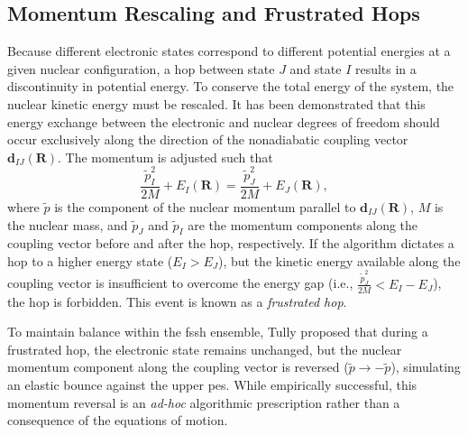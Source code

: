 \subsection{Momentum Rescaling and Frustrated Hops}
Because different electronic states correspond to different potential energies at a given nuclear configuration, a hop between state $J$ and state $I$ results in a discontinuity in potential energy. To conserve the total energy of the system, the nuclear kinetic energy must be rescaled. It has been demonstrated that this energy exchange between the electronic and nuclear degrees of freedom should occur exclusively along the direction of the nonadiabatic coupling vector $\symbf{d}_{IJ}(\symbf{R})$. The momentum is adjusted such that
\begin{equation}\label{eq:fssh_energy_conservation}
\frac{\tilde{p}_I^2}{2M}+E_I(\symbf{R})=\frac{\tilde{p}_J^2}{2M}+E_J(\symbf{R}),
\end{equation}
where $\tilde{p}$ is the component of the nuclear momentum parallel to $\symbf{d}_{IJ}(\symbf{R})$, $M$ is the nuclear mass, and $\tilde{p}_J$ and $\tilde{p}_I$ are the momentum components along the coupling vector before and after the hop, respectively. If the algorithm dictates a hop to a higher energy state ($E_I>E_J$), but the kinetic energy available along the coupling vector is insufficient to overcome the energy gap (i.e., $\frac{\tilde{p}_J^2}{2M}<E_I-E_J$), the hop is forbidden. This event is known as a \textit{frustrated hop}.

To maintain balance within the \acrshort{fssh} ensemble, Tully proposed that during a frustrated hop, the electronic state remains unchanged, but the nuclear momentum component along the coupling vector is reversed ($\tilde{p}\to-\tilde{p}$), simulating an elastic bounce against the upper \acrshort{pes}. While empirically successful, this momentum reversal is an \textit{ad-hoc} algorithmic prescription rather than a consequence of the equations of motion.

